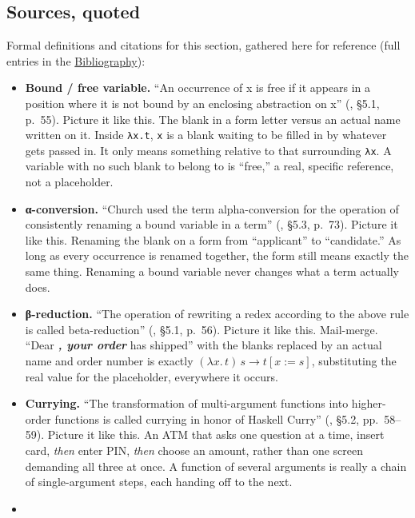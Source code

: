 \subsection{Sources, quoted}\label{sec:02-terminology-and-coc:01-terminology:11}

Formal definitions and citations for this section, gathered here for reference (full entries in the \hyperref[sec:root:bibliography:1]{Bibliography}):

\begin{itemize}
\tightlist
\item
  \textbf{Bound / free variable.} ``An occurrence of x is free if it appears in a position where it is not bound by an enclosing abstraction on x'' (\cite{Pierce2002}, §5.1, p.~55). Picture it like this. The blank in a form letter versus an actual name written on it. Inside \texttt{λx.t}, \texttt{x} is a blank waiting to be filled in by whatever gets passed in. It only means something relative to that surrounding \texttt{λx}. A variable with no such blank to belong to is ``free,'' a real, specific reference, not a placeholder.
\item
  \textbf{α-conversion.} ``Church used the term alpha-conversion for the operation of consistently renaming a bound variable in a term'' (\cite{Pierce2002}, §5.3, p.~73). Picture it like this. Renaming the blank on a form from ``applicant'' to ``candidate.'' As long as every occurrence is renamed together, the form still means exactly the same thing. Renaming a bound variable never changes what a term actually does.
\item
  \textbf{β-reduction.} ``The operation of rewriting a redex according to the above rule is called beta-reduction'' (\cite{Pierce2002}, §5.1, p.~56). Picture it like this. Mail-merge. ``Dear \textbf{\emph{, your order }} has shipped'' with the blanks replaced by an actual name and order number is exactly \((\lambda x.\, t)\, s \to t[x := s]\), substituting the real value for the placeholder, everywhere it occurs.
\item
  \textbf{Currying.} ``The transformation of multi-argument functions into higher-order functions is called currying in honor of Haskell Curry'' (\cite{Pierce2002}, §5.2, pp.~58--59). Picture it like this. An ATM that asks one question at a time, insert card, \emph{then} enter PIN, \emph{then} choose an amount, rather than one screen demanding all three at once. A function of several arguments is really a chain of single-argument steps, each handing off to the next.
\item

\end{itemize}
